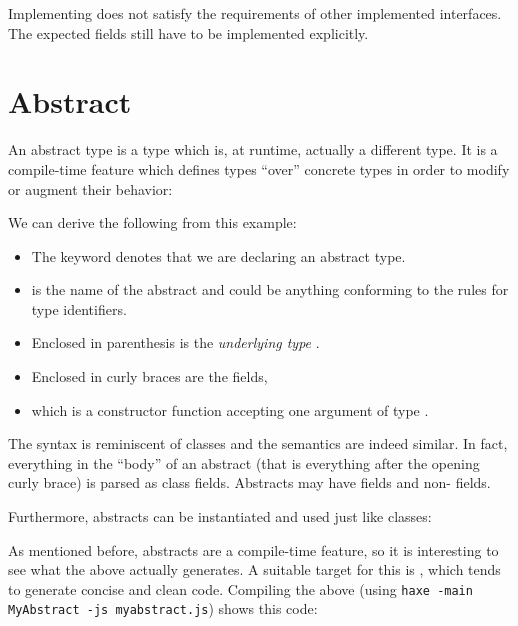 \documentclass{haxe}
\begin{document}
Implementing  does not satisfy the requirements of other implemented interfaces. The expected fields still have to be implemented explicitly.





\section{Abstract}
\label{types-abstract}

An abstract type is a type which is, at runtime, actually a different type. It is a compile-time feature which defines types ``over'' concrete types in order to modify or augment their behavior:

We can derive the following from this example:

\begin{itemize}
	\item The keyword  denotes that we are declaring an abstract type.
	\item {} is the name of the abstract and could be anything conforming to the rules for type identifiers.
	\item Enclosed in parenthesis \expr{()} is the \emph{underlying type} .
	\item Enclosed in curly braces \expr{$\left\{\right\}$} are the fields,
	\item which is a constructor function  accepting one argument  of type .
\end{itemize}


The syntax is reminiscent of classes and the semantics are indeed similar. In fact, everything in the ``body'' of an abstract (that is everything after the opening curly brace) is parsed as class fields. Abstracts may have  fields and non-  fields.

Furthermore, abstracts can be instantiated and used just like classes:

As mentioned before, abstracts are a compile-time feature, so it is interesting to see what the above actually generates. A suitable target for this is , which tends to generate concise and clean code. Compiling the above (using \texttt{haxe -main MyAbstract -js myabstract.js}) shows this  code:
\end{document}
